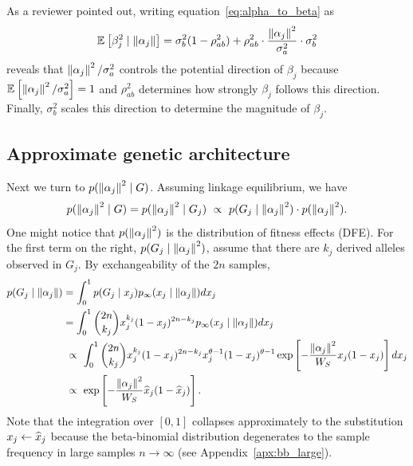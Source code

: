 \documentclass[10pt]{article}
\begin{document}
As a reviewer pointed out, writing equation~\eqref{eq:alpha_to_beta} as
\begin{align}
    \mathbb{E}_{}\left[\beta_j^2 \mid \left\| \alpha_j \right\|\right] = \sigma_b^2 (1- \rho_{ab}^2) + \rho_{ab}^2 \cdot \frac{\left\| \alpha_j \right\|^2}{\sigma_a^2} \cdot \sigma_b^2
\end{align}
reveals that $\left\| \alpha_j \right\|^2 / \sigma_a^2$ controls the potential direction of $\beta_j$ because $\mathbb{E}_{}\left[\left\| \alpha_j \right\|^2 / \sigma_a^2\right]=1$ and $\rho_{ab}^2$ determines how strongly $\beta_j$ follows this direction.
Finally, $\sigma_b^2$ scales this direction to determine the magnitude of $\beta_j$.

\subsection{Approximate genetic architecture}
Next we turn to $p(\left\| \alpha_j \right\|^2 \mid G)$.
Assuming linkage equilibrium, we have
\begin{equation}
 \label{eq:bayes_for_alpha}
p(\norm{\alpha_j}^2 \mid G) = 
    p(\norm{\alpha_j}^2 \mid G_j)\ \propto\ 
        p(G_j \mid \norm{\alpha_j}^2) \cdot p(\norm{\alpha_j}^2).
\end{equation}
One might notice that $p(\left\| \alpha_j \right\|^2)$ is the distribution of fitness effects (DFE). 
For the first term on the right, $p(G_j \mid \left\| \alpha_j \right\|^2)$, assume that
there are $k_j$ derived alleles observed in $G_j$. By exchangeability of the $2n$ samples,
\begin{align}
\label{eq:fwd_alpha_to_g}
    \begin{aligned}
    p(G_j \mid \norm{\alpha_j})    
    &=
    \int_0^1 
    p(G_j \mid x_j)
    p_{\infty}(x_j \mid \norm{\alpha_j})
    dx_j \\
    &=
    \int_0^1 
    \binom{2n}{k_j} 
    x_j^{k_j}(1-x_j)^{2n-k_j}
    \pinf(x_j \mid \norm{\alpha_j}) 
    dx_j \\
    & \ \propto \ \int_0^1   
    \binom{2n}{k_j} 
    x_j^{k_j}(1-x_j)^{2n-k_j}
    x_j^{\theta-1}(1-x_j)^{\theta-1}
    \exp\left[-\frac{\norm{\alpha_j}^2}{W_S}x_j(1-x_j) \right]dx_j \\
    &\ \propto \ \exp\left[-\frac{\norm{\alpha_j}^2}{W_S}\hx_j(1-\hx_j) \right].
    \end{aligned}
\end{align}
Note that the integration over $[0,1]$ collapses approximately to the substitution $x_j \leftarrow \widehat{x}_j$ because the beta-binomial distribution degenerates to the sample frequency in large samples $n \rightarrow \infty$ (see Appendix~\ref{apx:bb_large}).
\end{document}
